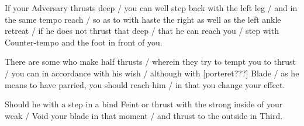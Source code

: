 If your Adversary thrusts deep / you can well step back with the left
leg / and in the same tempo reach / so as to with haste the right as
well as the left ankle retreat / if he does not thrust that deep /
that he can reach you / step with Counter-tempo and the foot in front
of you.


There are some who make half thrusts / wherein they try to tempt you
to thrust / you can in accordance with his wish / although with
[porteret???] Blade / as he means to have
parried, you should reach him / in that you change your effect.


Should he with a step in a bind Feint or thrust with the strong inside
of your weak / Void your blade in that moment / and thrust to the
outside in Third.